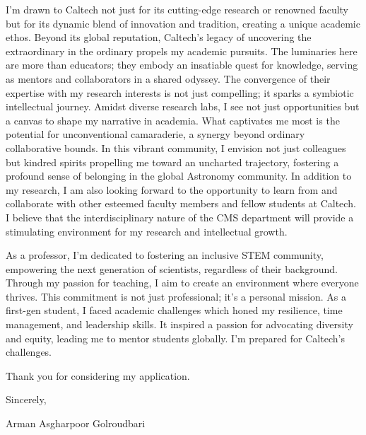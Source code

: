\documentclass[a4,20pt]{article}
\begin{document}
\begin{large}
I'm drawn to Caltech not just for its cutting-edge research or renowned faculty but for its dynamic blend of innovation and tradition, creating a unique academic ethos. Beyond its global reputation, Caltech's legacy of uncovering the extraordinary in the ordinary propels my academic pursuits. The luminaries here are more than educators; they embody an insatiable quest for knowledge, serving as mentors and collaborators in a shared odyssey. The convergence of their expertise with my research interests is not just compelling; it sparks a symbiotic intellectual journey. Amidst diverse research labs, I see not just opportunities but a canvas to shape my narrative in academia. What captivates me most is the potential for unconventional camaraderie, a synergy beyond ordinary collaborative bounds. In this vibrant community, I envision not just colleagues but kindred spirits propelling me toward an uncharted trajectory, fostering a profound sense of belonging in the global Astronomy community. In addition to my research, I am also looking forward to the opportunity to learn from and collaborate with other esteemed faculty members and fellow students at Caltech. I believe that the interdisciplinary nature of the CMS department will provide a stimulating environment for my research and intellectual growth.


As a professor, I'm dedicated to fostering an inclusive STEM community, empowering the next generation of scientists, regardless of their background. Through my passion for teaching, I aim to create an environment where everyone thrives. This commitment is not just professional; it's a personal mission. As a first-gen student, I faced academic challenges which honed my resilience, time management, and leadership skills. It inspired a passion for advocating diversity and equity, leading me to mentor students globally. I'm prepared for Caltech's challenges.




\vspace{0.05cm}
Thank you for considering my application.\vspace{-0.1cm}

Sincerely, \vspace{-0.1cm}

Arman Asgharpoor Golroudbari


\end{large}
\end{document}
